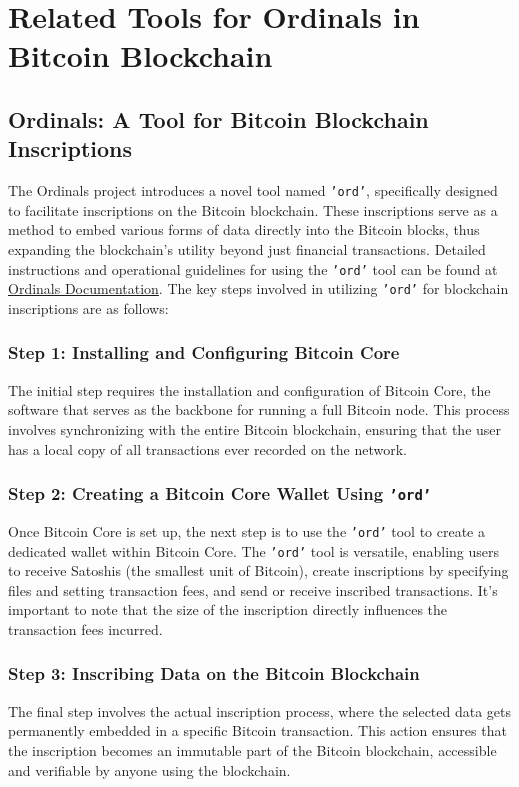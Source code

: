 \section{Related Tools for Ordinals in Bitcoin Blockchain}

\subsection{Ordinals: A Tool for Bitcoin Blockchain Inscriptions}
The Ordinals project introduces a novel tool named \texttt{'ord'}, 
specifically designed to facilitate inscriptions on the Bitcoin blockchain. 
These inscriptions serve as a method to embed various forms of data directly into the Bitcoin blocks, 
thus expanding the blockchain's utility beyond just financial transactions. 
Detailed instructions and operational guidelines for using the \texttt{'ord'} tool can be found at 
\href{https://docs.ordinals.com/guides/inscriptions.html}{Ordinals Documentation}. 
The key steps involved in utilizing \texttt{'ord'} for blockchain inscriptions are as follows:

\subsubsection{Step 1: Installing and Configuring Bitcoin Core}
The initial step requires the installation and configuration of Bitcoin Core, 
the software that serves as the backbone for running a full Bitcoin node. 
This process involves synchronizing with the entire Bitcoin blockchain, 
ensuring that the user has a local copy of all transactions ever recorded on the network.

\subsubsection{Step 2: Creating a Bitcoin Core Wallet Using \texttt{'ord'}}
Once Bitcoin Core is set up, the next step is to use the \texttt{'ord'} tool to create a dedicated wallet within Bitcoin Core. The \texttt{'ord'} tool is versatile, enabling users to receive Satoshis (the smallest unit of Bitcoin), create inscriptions by specifying files and setting transaction fees, and send or receive inscribed transactions. It's important to note that the size of the inscription directly influences the transaction fees incurred.

\subsubsection{Step 3: Inscribing Data on the Bitcoin Blockchain}
The final step involves the actual inscription process, 
where the selected data gets permanently embedded in a specific Bitcoin transaction. 
This action ensures that the inscription becomes an immutable part of the Bitcoin blockchain, 
accessible and verifiable by anyone using the blockchain.

